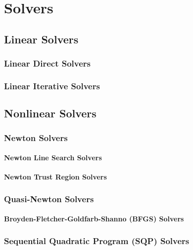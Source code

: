 \clearemptydoublepage
\chapter{Solvers}
\label{cha:solvers}

\section{Linear Solvers}

\subsection{Linear Direct Solvers}

\subsection{Linear Iterative Solvers}

\section{Nonlinear Solvers}

\subsection{Newton Solvers}

\subsubsection{Newton Line Search Solvers}

\subsubsection{Newton Trust Region Solvers}

\subsection{Quasi-Newton Solvers}

\subsubsection{Broyden-Fletcher-Goldfarb-Shanno (BFGS) Solvers}

\subsection{Sequential Quadratic Program (SQP) Solvers}

